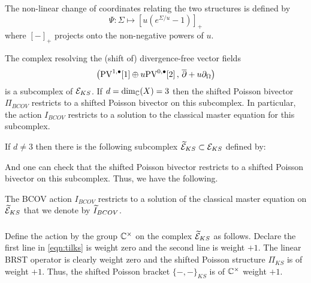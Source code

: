 \documentclass[11pt]{amsart}
\begin{document}
The non-linear change of coordinates relating the two structures is defined by
\[
\Psi \colon \Sigma \mapsto \left[u (e^{\Sigma/u} -1)\right]_+
\]
where $[-]_+$ projects onto the non-negative powers of $u$.  

\parsec[]

The complex resolving the (shift of) divergence-free vector fields 
\[
\left({\rm PV}^{1,\bullet}[1] \oplus u {\rm PV}^{0,\bullet}[2] \, , \, \overline{\partial} + u \partial_{\Omega}\right) 
\]
is a subcomplex of $\mathcal E_{KS}$.
If $d = \dim_\mathbb C(X)=3$ then the shifted Poisson bivector $\Pi_{BCOV}$ restricts to a shifted Poisson bivector on this subcomplex. 
In particular, the action $I_{BCOV}$ restricts to a solution to the classical master equation for this subcomplex. 

If $d \ne 3$ then there is the following subcomplex $\widetilde{\mathcal E}_{KS}\subset \mathcal E_{KS}$ defined by:
\beqn\label{eqn:tilks}
\eeqn
And one can check that the shifted Poisson bivector restricts to a shifted Poisson bivector on this subcomplex. 
Thus, we have the following.

\begin{prop}
\label{prop:tilbcov}
The BCOV action $I_{BCOV}$ restricts to a solution of the classical master equation on $\widetilde{\mathcal E}_{KS}$ that we denote by $\widetilde{I}_{BCOV}$. 
\end{prop}

\subsubsection{}

Define the action by the group $\mathbb C^\times$ on the complex $\widetilde{\mathcal E}_{KS}$ as follows.
Declare the first line in \eqref{eqn:tilks} is weight zero and the second line is weight $+1$. 
The linear BRST operator is clearly weight zero and the shifted Poisson structure $\Pi_{KS}$ is of weight $+1$. 
Thus, the shifted Poisson bracket $\{-,-\}_{KS}$ is of $\mathbb C^\times$ weight $+1$.
\end{document}
